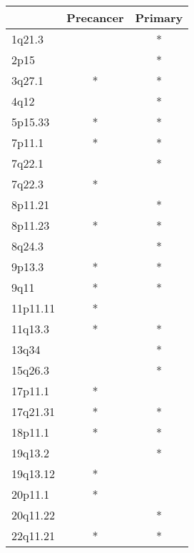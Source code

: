 \begin{tabular}{lcc}
\toprule
{} & Precancer & Primary \\
\midrule
1q21.3   &           &       * \\
2p15     &           &       * \\
3q27.1   &         * &       * \\
4q12     &           &       * \\
5p15.33  &         * &       * \\
7p11.1   &         * &       * \\
7q22.1   &           &       * \\
7q22.3   &         * &         \\
8p11.21  &           &       * \\
8p11.23  &         * &       * \\
8q24.3   &           &       * \\
9p13.3   &         * &       * \\
9q11     &         * &       * \\
11p11.11 &         * &         \\
11q13.3  &         * &       * \\
13q34    &           &       * \\
15q26.3  &           &       * \\
17p11.1  &         * &         \\
17q21.31 &         * &       * \\
18p11.1  &         * &       * \\
19q13.2  &           &       * \\
19q13.12 &         * &         \\
20p11.1  &         * &         \\
20q11.22 &           &       * \\
22q11.21 &         * &       * \\
\bottomrule
\end{tabular}
